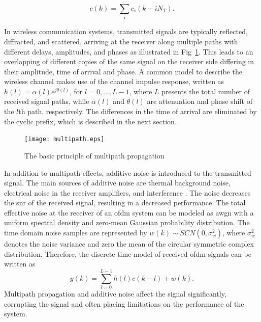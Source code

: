 \begin{equation}\label{concat}
c(k)=\sum_i{c_i(k -iN_T)}.
\end{equation} 

In wireless communication systems, transmitted signals are typically reflected, diffracted, and scattered, arriving at the receiver along multiple paths with different delays, amplitudes, and phases as illustrated in Fig~\ref{fig:multipath}. This leads to an overlapping of different copies of the same signal on the receiver side differing in their amplitude, time of arrival and phase. A common model to describe the wireless channel makes use of the {channel impulse response}, written as $h(l)=\alpha(l) e^{j\theta(l)}$, for $l = 0,\ldots,L-1 $, where $L$ presents the total number of received signal paths, while $\alpha(l)$ and $ \theta(l)$ are attenuation and phase shift of the $l$th path, respectively. The differences in the time of arrival are eliminated by the cyclic prefix, which is described in the next section. %
%
\begin{figure}[thb]
\centering
\texttt{[image: multipath.eps]}
\caption{The basic principle of multipath propagation}\label{fig:multipath}
\end{figure}
%
In addition to multipath effects, additive noise is introduced to the transmitted signal. The main sources of additive noise are thermal background noise, electrical noise in the receiver amplifiers, and interference \cite{StuberOFDM}. The noise decreases the \gls{snr} of the received signal, resulting in a decreased performance. The total effective noise at the receiver of an \gls{ofdm} system can be modeled as \gls{awgn} with a uniform spectral density and zero-mean Gaussian probability distribution. The time domain noise samples are represented by $w(k) \sim SCN(0,\sigma_w^2)$, where $\sigma_w^2$ denotes the noise variance and zero the mean of the circular symmetric complex distribution. Therefore, the discrete-time model of received \gls{ofdm} signals can be written as
\begin{equation}
\label{eqn:multipath}
y(k) = \sum_{l = 0}^{L-1} h(l)c(k-l) + w(k).
\end{equation}
%
Multipath propagation and additive noise affect the signal significantly, corrupting the signal and often placing limitations on the performance of the system.



